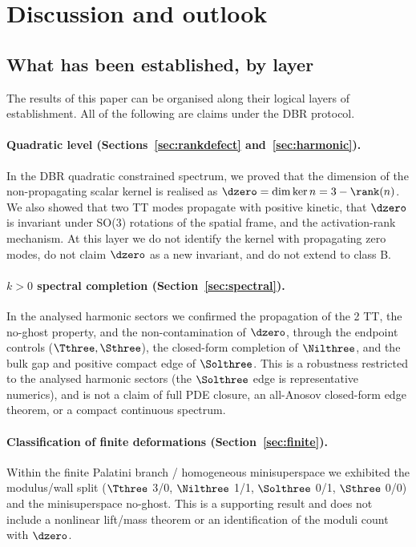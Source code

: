 \section{Discussion and outlook}
\label{sec:discussion}

\subsection{What has been established, by layer}
\label{sec:discussion:layers}

The results of this paper can be organised along their logical layers of
establishment.  All of the following are claims under the DBR protocol.

\paragraph{Quadratic level (Sections~\ref{sec:rankdefect} and~\ref{sec:harmonic}).}
In the DBR quadratic constrained spectrum, we proved that the dimension of the
non-propagating scalar kernel is realised as
$\dzero=\dim\ker n=3-\rank(n)$.  We also showed that two TT modes propagate with
positive kinetic, that $\dzero$ is invariant under SO(3) rotations of the spatial
frame, and the activation-rank mechanism.  At this layer we do not identify the
kernel with propagating zero modes, do not claim $\dzero$ as a new invariant, and
do not extend to class B.

\paragraph{$k>0$ spectral completion (Section~\ref{sec:spectral}).}
In the analysed harmonic sectors we confirmed the propagation of the 2 TT, the
no-ghost property, and the non-contamination of $\dzero$, through the endpoint
controls ($\Tthree,\Sthree$), the closed-form completion of $\Nilthree$, and the
bulk gap and positive compact edge of $\Solthree$.  This is a robustness
restricted to the analysed harmonic sectors (the $\Solthree$ edge is
representative numerics), and is not a claim of full PDE closure, an all-Anosov
closed-form edge theorem, or a compact continuous spectrum.

\paragraph{Classification of finite deformations (Section~\ref{sec:finite}).}
Within the finite Palatini branch / homogeneous minisuperspace we exhibited the
modulus/wall split ($\Tthree$ 3/0, $\Nilthree$ 1/1, $\Solthree$ 0/1, $\Sthree$
0/0) and the minisuperspace no-ghost.  This is a supporting result and does not
include a nonlinear lift/mass theorem or an identification of the moduli count
with $\dzero$.

